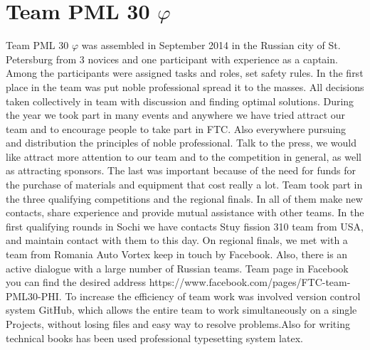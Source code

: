 
\section{Team PML 30 ${\varphi}$} 
		Team PML 30 ${\varphi}$ was assembled in September 2014 in  the Russian city of St. Petersburg from 3 novices and one participant with experience as a captain. Among the participants were assigned tasks and roles, set safety rules. In the first place in the team was put noble professional spread it to the masses.  All decisions taken collectively in team with discussion and finding optimal solutions. 
		During the year we took part in many events and anywhere we have tried attract our team and to encourage people to take part in FTC. Also everywhere pursuing and distribution the principles of noble professional. Talk to the press, we would like attract more attention to our team and to the competition in general, as well as attracting sponsors. The last was important because of the need for funds for the purchase of materials and equipment that cost really a lot.
		Team took part in the three qualifying competitions and the regional finals. In all of them make new contacts, share experience and provide mutual assistance with other teams. In the first qualifying rounds in Sochi we have contacts Stuy  fission 310 team from USA, and maintain contact with them to this day. On regional finals, we met with a team from Romania Auto Vortex keep in touch by Facebook. Also, there is an active dialogue with a large number of Russian teams. Team page in Facebook you can find the desired address https://www.facebook.com/pages/FTC-team-PML30-PHI.
	    To increase the efficiency of team work was involved version control system GitHub, which allows the entire team to work simultaneously on a single Projects, without losing files and easy way to resolve problems.Also for writing technical books has been used professional typesetting system latex.
	    \\
